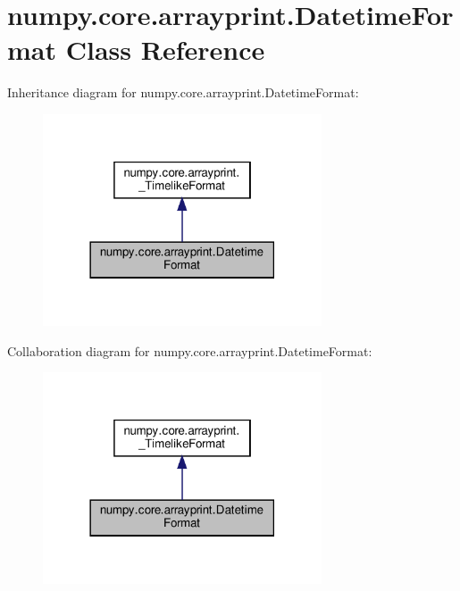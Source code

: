 \hypertarget{classnumpy_1_1core_1_1arrayprint_1_1DatetimeFormat}{}\section{numpy.\+core.\+arrayprint.\+Datetime\+Format Class Reference}
\label{classnumpy_1_1core_1_1arrayprint_1_1DatetimeFormat}


Inheritance diagram for numpy.\+core.\+arrayprint.\+Datetime\+Format\+:
\nopagebreak
\begin{figure}[H]
\begin{center}
\leavevmode
\includegraphics[width=234pt]{classnumpy_1_1core_1_1arrayprint_1_1DatetimeFormat__inherit__graph}
\end{center}
\end{figure}


Collaboration diagram for numpy.\+core.\+arrayprint.\+Datetime\+Format\+:
\nopagebreak
\begin{figure}[H]
\begin{center}
\leavevmode
\includegraphics[width=234pt]{classnumpy_1_1core_1_1arrayprint_1_1DatetimeFormat__coll__graph}
\end{center}
\end{figure}
